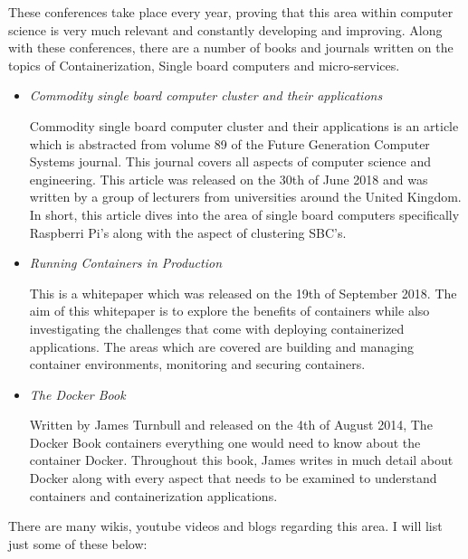 These conferences take place every year, proving that this area within computer science is very much relevant and constantly developing and improving. Along with these conferences, there are a number of books and journals written on the topics of Containerization, Single board computers and micro-services. 

\begin{itemize}
    \item \textit{Commodity single board computer cluster and their applications} \cite{Reference7}
    
    Commodity single board computer cluster and their applications is an article which is abstracted from volume 89 of the Future Generation Computer Systems journal. This journal covers all aspects of computer science and engineering. This article was released on the 30th of June 2018 and was written by a group of lecturers from universities around the United Kingdom. In short, this article dives into the area of single board computers specifically Raspberri Pi's along with the aspect of clustering SBC's. 
    
    \item \textit{Running Containers in Production} \cite{Reference8}
    
    This is a whitepaper which was released on the 19th of September 2018. The aim of this whitepaper is to explore the benefits of containers while also investigating the challenges that come with deploying containerized applications. The areas which are covered are building and managing container environments, monitoring and securing containers.
    
    \item \textit{The Docker Book} \cite{Reference9}
    
    Written by James Turnbull and released on the 4th of August 2014, The Docker Book containers everything one would need to know about the container Docker. Throughout this book, James writes in much detail about Docker along with every aspect that needs to be examined to understand containers and containerization applications.
    
\end{itemize}

There are many wikis, youtube videos and blogs regarding this area. I will list just some of these below:

